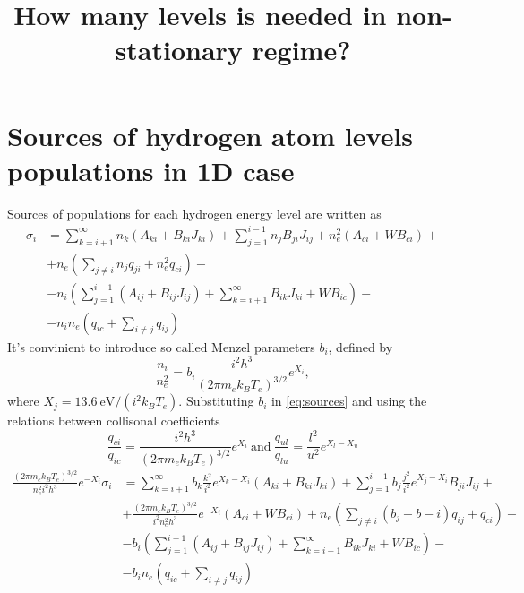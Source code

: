 \documentclass{article}
\title{How many levels is needed in non-stationary regime?}
\begin{document}
\maketitle
    
\section{Sources of hydrogen atom levels populations in 1D case}

Sources of populations for each hydrogen energy level are written as
\begin{equation}\label{eq:sources}
    \begin{aligned}
        \sigma_i &= \sum\limits_{k=i+1}^\infty n_k(A_{ki} + B_{ki}J_{ki}) + \sum\limits_{j=1}^{i-1} n_jB_{ji}J_{ij}+ n_e^2(A_{ci} + WB_{ci})+\\
        &+n_e\left(\sum\limits_{j\neq i}n_jq_{ji}  + n_e^2q_{ci}\right)-\\
        &-n_i\left(\sum\limits_{j=1}^{i-1}(A_{ij} + B_{ij}J_{ij}) + \sum\limits_{k=i+1}^\infty B_{ik}J_{ki} + WB_{ic}\right) -\\
        &-n_in_e\left(q_{ic} + \sum\limits_{i \neq j}q_{ij}\right)
    \end{aligned}
\end{equation}
It's convinient to introduce so called Menzel parameters \(b_i\), defined by
\begin{equation}\label{eq:menzel}
    \frac{n_i}{n_e^2} = b_i\frac{i^2h^3}{(2\pi m_ek_BT_e)^{3/2}}e^{X_i},
\end{equation}
where \(X_j = 13.6\ \mathrm{eV}/(i^2k_BT_e)\). Substituting \(b_i\) in \eqref{eq:sources} and using the relations between collisonal coefficients
\[
\frac{q_{ci}}{q_{ic}} = \frac{i^2h^3}{(2\pi m_ek_BT_e)^{3/2}}e^{X_i}\ \mathrm{and}\  \frac{q_{ul}}{q_{lu}} = \frac{l^2}{u^2}e^{X_l - X_u}
\]
\begin{equation}
    \begin{aligned}
        \frac{(2\pi m_ek_BT_e)^{3/2}}{n_e^2i^2h^3}e^{-X_i}\sigma_i &= \sum\limits_{k=i+1}^\infty b_k\frac{k^2}{i^2}e^{X_k-X_i}(A_{ki} + B_{ki}J_{ki}) + \sum\limits_{j=1}^{i-1} b_j\frac{j^2}{i^2}e^{X_j-X_i}B_{ji}J_{ij} +\\
        &+\frac{(2\pi m_ek_BT_e)^{3/2}}{i^2n_e^2h^3}e^{-X_i}(A_{ci} + WB_{ci}) +n_e\left(\sum\limits_{j \neq i}(b_j-b-i)q_{ij}  + q_{ci}\right)-\\
        &-b_i\left(\sum\limits_{j=1}^{i-1}(A_{ij} + B_{ij}J_{ij}) + \sum\limits_{k=i+1}^\infty B_{ik}J_{ki} + WB_{ic}\right) -\\
        &-b_in_e\left(q_{ic} + \sum\limits_{i \neq j}q_{ij}\right)
    \end{aligned}
\end{equation}
\end{document}
